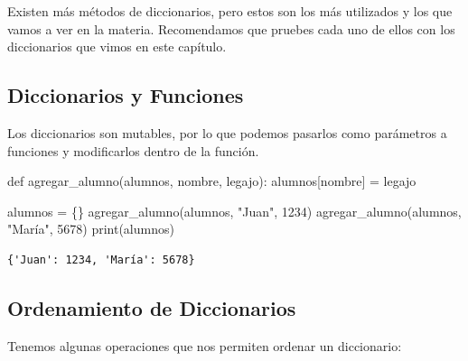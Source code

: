 \documentclass[
  letterpaper,
  DIV=11,
  numbers=noendperiod]{scrreprt}
\newenvironment{Shaded}{\begin{snugshade}}{\end{snugshade}}
\newcommand{\BuiltInTok}[1]{\textcolor[rgb]{0.00,0.23,0.31}{#1}}
\newcommand{\DecValTok}[1]{\textcolor[rgb]{0.68,0.00,0.00}{#1}}
\newcommand{\KeywordTok}[1]{\textcolor[rgb]{0.00,0.23,0.31}{#1}}
\newcommand{\NormalTok}[1]{\textcolor[rgb]{0.00,0.23,0.31}{#1}}
\newcommand{\OperatorTok}[1]{\textcolor[rgb]{0.37,0.37,0.37}{#1}}
\newcommand{\StringTok}[1]{\textcolor[rgb]{0.13,0.47,0.30}{#1}}
\begin{document}
\begin{tcolorbox}[enhanced jigsaw, bottomrule=.15mm, leftrule=.75mm, opacityback=0, colback=white, toprule=.15mm, bottomtitle=1mm, opacitybacktitle=0.6, rightrule=.15mm, left=2mm, arc=.35mm, coltitle=black, title=\textcolor{quarto-callout-note-color}{\faInfo}\hspace{0.5em}{Note}, breakable, toptitle=1mm, colframe=quarto-callout-note-color-frame, titlerule=0mm, colbacktitle=quarto-callout-note-color!10!white]

Existen más métodos de diccionarios, pero estos son los más utilizados y
los que vamos a ver en la materia. Recomendamos que pruebes cada uno de
ellos con los diccionarios que vimos en este capítulo.

\end{tcolorbox}

\subsection{Diccionarios y Funciones}\label{diccionarios-y-funciones}

Los diccionarios son mutables, por lo que podemos pasarlos como
parámetros a funciones y modificarlos dentro de la función.

\begin{Shaded}
\begin{Highlighting}[]
\KeywordTok{def}\NormalTok{ agregar\_alumno(alumnos, nombre, legajo):}
\NormalTok{  alumnos[nombre] }\OperatorTok{=}\NormalTok{ legajo}

\NormalTok{alumnos }\OperatorTok{=}\NormalTok{ \{\}}
\NormalTok{agregar\_alumno(alumnos, }\StringTok{"Juan"}\NormalTok{, }\DecValTok{1234}\NormalTok{)}
\NormalTok{agregar\_alumno(alumnos, }\StringTok{"María"}\NormalTok{, }\DecValTok{5678}\NormalTok{)}
\BuiltInTok{print}\NormalTok{(alumnos)}
\end{Highlighting}
\end{Shaded}

\begin{verbatim}
{'Juan': 1234, 'María': 5678}
\end{verbatim}

\subsection{Ordenamiento de
Diccionarios}\label{ordenamiento-de-diccionarios}

Tenemos algunas operaciones que nos permiten ordenar un diccionario:
\end{document}
